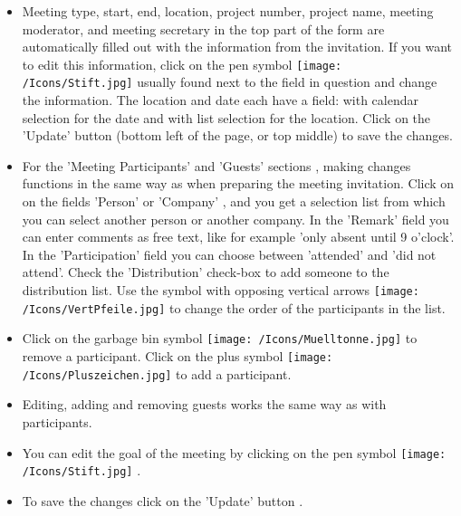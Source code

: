 \begin{figure}[H]
\end{figure}

\begin{itemize}
\item
Meeting type, start, end, location, project number, project name, meeting moderator, and meeting secretary in the top part of the form are automatically filled out with the information from the invitation. If you want to edit this information, click on the pen symbol \texttt{[image: /Icons/Stift.jpg]}  usually found next to the field in question and change the information. The location and date each have a field: with calendar selection for the date and with list selection for the location. Click on the 'Update' button  (bottom left of the page, or top middle) to save the changes.
\item
For the 'Meeting Participants' and 'Guests' sections , making changes functions in the same way as when preparing the meeting invitation. Click on on the fields 'Person'  or 'Company' , and you get a selection list from which you can select another person or another company. In the 'Remark' field  you can enter comments as free text, like for example 'only absent until 9 o’clock'. In the 'Participation' field  you can choose between 'attended' and 'did not attend'. Check the 'Distribution' check-box  to add someone to the distribution list. Use the symbol with opposing vertical arrows \texttt{[image: /Icons/VertPfeile.jpg]}  to change the order of the participants in the list.
\item
Click on the garbage bin symbol \texttt{[image: /Icons/Muelltonne.jpg]}  to remove a participant. Click on the plus symbol \texttt{[image: /Icons/Pluszeichen.jpg]}  to add a participant.
\item
Editing, adding and removing guests works the same way as with participants.
\item
You can edit the goal of the meeting by clicking on the pen symbol \texttt{[image: /Icons/Stift.jpg]} .
\item
To save the changes click on the 'Update' button .
\end{itemize}

